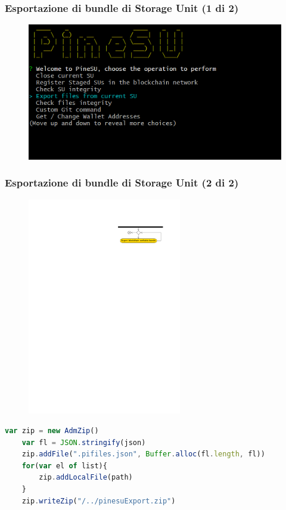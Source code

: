 \documentclass{beamer}
\begin{document}
\begin{frame}
	\frametitle{Esportazione di bundle di Storage Unit (1 di 2)}
	\begin{figure}
		\includegraphics[width=\textwidth]{figures/ops/6.png}
	\end{figure}
\end{frame}

\begin{frame}[fragile]
	\frametitle{Esportazione di bundle di Storage Unit (2 di 2)}
	\begin{figure}
		\includegraphics[width=0.6\textwidth]{figures/export.pdf}
	\end{figure}
	\begin{lstlisting}[language=JavaScript, numbers=none]
	var zip = new AdmZip()
	var fl = JSON.stringify(json)
	zip.addFile(".pifiles.json", Buffer.alloc(fl.length, fl))
	for(var el of list){
		zip.addLocalFile(path)
	}
	zip.writeZip("/../pinesuExport.zip")
	\end{lstlisting}
\end{frame}
\end{document}
